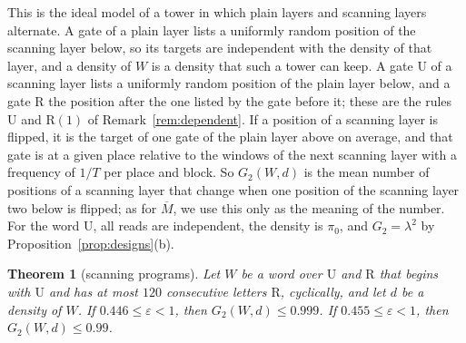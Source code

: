 \documentclass[11pt]{amsart}
\newtheorem{theorem}{Theorem}
\theoremstyle{definition}
\theoremstyle{remark}
\newcommand{\eps}{\varepsilon}
\begin{document}
\noindent This is the ideal model of a tower in which plain layers and scanning layers
alternate. A gate of a plain layer lists a uniformly random position of the scanning layer
below, so its targets are independent with the density of that layer, and a density of $W$ is a
density that such a tower can keep. A gate $\mathrm U$ of a scanning layer lists a uniformly
random position of the plain layer below, and a gate $\mathrm R$ the position after the one
listed by the gate before it; these are the rules $\mathrm U$ and $\mathrm R(1)$ of
Remark~\ref{rem:dependent}. If a position of a scanning layer is flipped, it is the target of
one gate of the plain layer above on average, and that gate is at a given place relative to the
windows of the next scanning layer with a frequency of $1/T$ per place and block. So $G_2(W,d)$
is the mean number of positions of a scanning layer that change when one position of the
scanning layer two below is flipped; as for $\overline M$, we use this only as the meaning of
the number. For the word $\mathrm U$, all reads are independent, the density is $\pi_0$, and
$G_2=\lambda^2$ by Proposition~\ref{prop:designs}(b).

\begin{theorem}[scanning programs]\label{thm:scan}
Let $W$ be a word over $\mathrm U$ and $\mathrm R$ that begins with $\mathrm U$ and has at most
$120$ consecutive letters $\mathrm R$, cyclically, and let $d$ be a density of $W$. If
$0.446\le\eps<1$, then $G_2(W,d)\le0.999$. If $0.455\le\eps<1$, then $G_2(W,d)\le0.99$.
\end{theorem}
\end{document}
